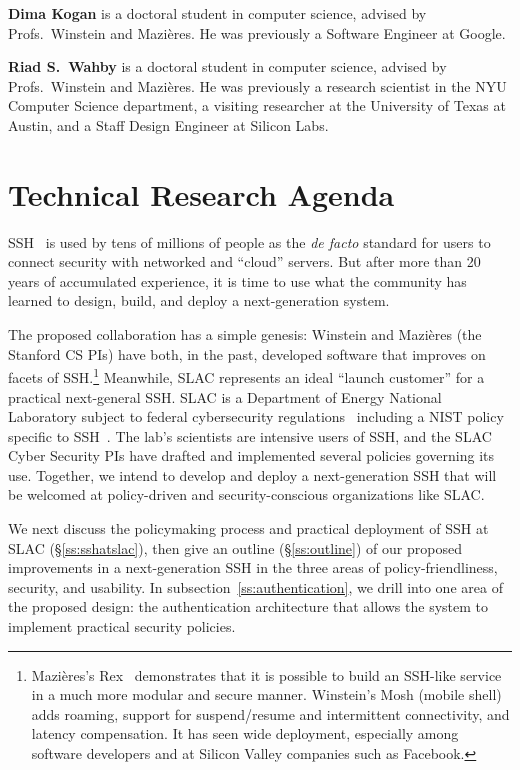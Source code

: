 \documentclass[10pt]{article}
\newcommand{\slim}{\vspace{0.5\baselineskip}}
\begin{document}
\noindent \textbf{Dima Kogan} is a doctoral student in computer science,
advised by Profs.~Winstein and Mazi\`{e}res. He was previously a Software
Engineer at Google.

\slim

\noindent \textbf{Riad S.~Wahby} is a doctoral student in computer science,
advised by Profs.~Winstein and Mazi\`{e}res. He was previously a
research scientist in the NYU Computer Science department, a
visiting researcher at the University of Texas at Austin, and a Staff
Design Engineer at Silicon Labs.

\section{Technical Research Agenda}

SSH~\cite{SSH} is used by tens of millions of people as the \emph{de
  facto} standard for users to connect security with networked and
``cloud'' servers. But after more than 20 years of accumulated
experience, it is time to use what the community has
learned to design, build, and deploy a next-generation system.

The proposed collaboration has a simple genesis: Winstein and
Mazi\`{e}res (the Stanford CS PIs) have both, in the past, developed
software that improves on facets of SSH.\footnote{Mazi\`{e}res's
  Rex~\cite{rex} demonstrates that it is possible to build an SSH-like
  service in a much more modular and secure manner. Winstein's Mosh
  (mobile shell)~\cite{Mosh} adds roaming, support for suspend/resume
  and intermittent connectivity, and latency compensation. It has seen
  wide deployment, especially among software developers and at Silicon
  Valley companies such as Facebook.} Meanwhile, SLAC represents an
ideal ``launch customer'' for a practical next-general SSH. SLAC is a
Department of Energy National Laboratory subject to federal
cybersecurity regulations~\cite{cyberframework, nist80053, trumpeo}
including a NIST policy specific to SSH~\cite{nistSSH}.  The lab's
scientists are intensive users of SSH, and the SLAC Cyber Security PIs
have drafted and implemented several policies governing its
use. Together, we intend to develop and deploy a next-generation SSH
that will be welcomed at policy-driven and security-conscious
organizations like SLAC.

We next discuss the policymaking process and practical deployment of
SSH at SLAC (\S\ref{ss:sshatslac}), then give an outline
(\S\ref{ss:outline}) of our proposed improvements in a next-generation
SSH in the three areas of policy-friendliness, security, and
usability. In subsection~\ref{ss:authentication}, we drill into one
area of the proposed design: the authentication architecture that
allows the system to implement practical security policies.
\end{document}
